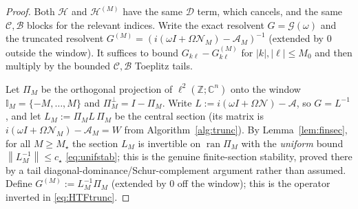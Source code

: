 \documentclass{amsart}
\theoremstyle{definition}
\newcommand{\C}{\mathbb{C}}
\newcommand{\Z}{\mathbb{Z}}
\newcommand{\norm}[1]{\left\lVert#1\right\rVert}
\newcommand{\Acal}{\mathcal{A}}
\newcommand{\Bcal}{\mathcal{B}}
\newcommand{\Ccal}{\mathcal{C}}
\newcommand{\Dcal}{\mathcal{D}}
\newcommand{\Hcal}{\mathcal{H}}
\newcommand{\Ncal}{\mathcal{N}}
\begin{document}
\begin{proof}
Both $\Hcal$ and $\Hcal^{(M)}$ have the same $\Dcal$ term, which cancels, and
the same $\Ccal,\Bcal$ blocks for the relevant indices. Write the exact resolvent
$G=\mathcal G(\omega)$ and the truncated resolvent
$G^{(M)}=(i(\omega I+\Omega\Ncal_M)-\Acal_M)^{-1}$ (extended by $0$ outside the
window). It suffices to bound $G_{k\ell}-G^{(M)}_{k\ell}$ for $|k|,|\ell|\le M_0$
and then multiply by the bounded $\Ccal,\Bcal$ Toeplitz tails.

Let $\Pi_M$ be the orthogonal projection of $\ell^2(\Z;\C^n)$ onto the window
$\mathbb I_M=\{-M,\dots,M\}$ and $\Pi_M^\perp=I-\Pi_M$. Write
$L:=i(\omega I+\Omega\Ncal)-\Acal$, so $G=L^{-1}$, and let
$L_M:=\Pi_M L\,\Pi_M$ be the central section (its matrix is
$i(\omega I+\Omega\Ncal_M)-\Acal_M=W$ from Algorithm~\ref{alg:trunc}). By
Lemma~\ref{lem:finsec}, for all $M\ge M_\star$ the section $L_M$ is invertible on
$\operatorname{ran}\Pi_M$ with the \emph{uniform} bound $\norm{L_M^{-1}}\le
c_\star$ \eqref{eq:unifstab}; this is the genuine finite-section stability, proved
there by a tail diagonal-dominance/Schur-complement argument rather than assumed.
Define
$G^{(M)}:=L_M^{-1}\Pi_M$ (extended by $0$ off the window); this is the operator
inverted in \eqref{eq:HTFtrunc}.


\end{proof}
\end{document}
